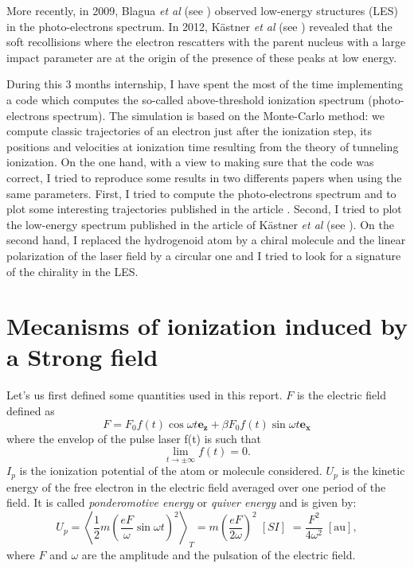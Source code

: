 \documentclass[a4paper]{article}
\begin{document}
\par
More recently, in 2009, Blagua \textit{et al} (see \cite{Blaga_2009}) observed low-energy structures (LES) in the photo-electrons spectrum. In 2012, K\"astner \textit{et al} (see \cite{Kastner_2012}) revealed that the soft recollisions where the electron rescatters with the parent nucleus with a large impact parameter are at the origin of the presence of these peaks at low energy.
\par
During this 3 months internship, I have spent the most of the time implementing a code which computes the so-called above-threshold ionization spectrum (photo-electrons spectrum). The simulation is based on the Monte-Carlo method: we compute classic trajectories of an electron just after the ionization step, its positions and velocities at ionization time resulting from the theory of tunneling ionization. 
On the one hand, with a view to making sure that the code was correct, I tried to reproduce some results in two differents papers when using the same parameters. First, I tried to compute the photo-electrons spectrum and to plot some interesting trajectories published in the article \cite{Hu_1997}. Second, I tried to plot the low-energy spectrum published in the article of K\"astner \textit{et al} (see \cite{Kastner_2012}).
On the second hand, I replaced the hydrogenoid atom by a chiral molecule and the linear polarization of the laser field by a circular one and I tried to look for a signature of the chirality in the LES.



\section{Mecanisms of ionization induced by a Strong field}
Let's us first defined some quantities used in this report. $F$ is the electric field defined as
\begin{equation}
F=F_{0} f(t)\cos{\omega t} \mathbf{e_{z}} + \beta F_{0} f(t)\sin{\omega t} \mathbf{e_{x}}
\end{equation}
where the envelop of the pulse laser f(t) is such that
\begin{equation}
\label{envelop}
 \lim_{t\to\pm\infty} f(t)=0.
\end{equation}
$I_{p}$ is the ionization potential of the atom or molecule considered. $U_{p}$ is the kinetic energy of the free electron in the electric field averaged over one period of the field. It is called \textit{ponderomotive energy} or \textit{quiver energy} and is given by:
\begin{equation}
U_{p}=\left< \frac{1}{2}m \left(\frac{eF}{\omega}\sin{\omega t} \right)^{2} \right>_{T} = m \left( \frac{eF}{2\omega} \right)^{2} \; [SI] \; = \frac{F^{2}}{4\omega^{2}} \; [\text{au}],
\end{equation}  
where $F$ and $\omega$ are the amplitude and the pulsation of the electric field.
\end{document}
